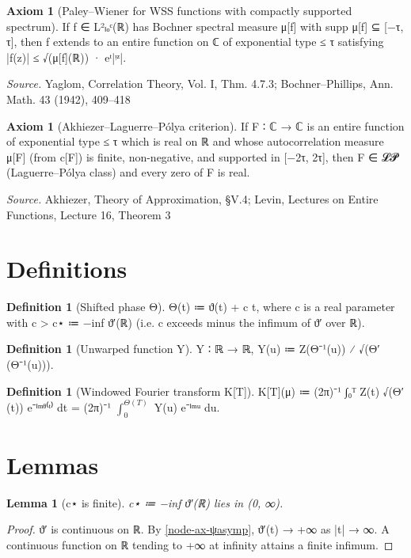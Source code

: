 \documentclass[11pt]{article}
\newtheorem{lemma}[theorem]{Lemma}
\theoremstyle{definition}
\newtheorem{definition}[theorem]{Definition}
\newtheorem{axiom}[theorem]{Axiom}
\begin{document}
\begin{axiom}[{Paley–Wiener for WSS functions with compactly supported spectrum}]\label{node-ax-PW}
If f ∈ L²ₗₒᶜ(ℝ) has Bochner spectral measure μ[f] with supp μ[f] ⊆ [−τ, τ], then f extends to an entire function on ℂ of exponential type ≤ τ satisfying |f(z)| ≤ √(μ[f](ℝ)) · eᵗ|ᵎᶻ|.
\end{axiom}
\noindent\textit{Source.} Yaglom, Correlation Theory, Vol. I, Thm. 4.7.3; Bochner–Phillips, Ann. Math. 43 (1942), 409–418

\begin{axiom}[{Akhiezer–Laguerre–Pólya criterion}]\label{node-ax-Akhiezer}
If F ∶ ℂ → ℂ is an entire function of exponential type ≤ τ which is real on ℝ and whose autocorrelation measure μ[F] (from c[F]) is finite, non-negative, and supported in [−2τ, 2τ], then F ∈ 𝓛𝓟 (Laguerre–Pólya class) and every zero of F is real.
\end{axiom}
\noindent\textit{Source.} Akhiezer, Theory of Approximation, §V.4; Levin, Lectures on Entire Functions, Lecture 16, Theorem 3

\section*{Definitions}
\begin{definition}[{Shifted phase Θ}]\label{node-def-Θ}
Θ(t) ≔ ϑ(t) + c t, where c is a real parameter with c > c⋆ ≔ −inf ϑ′(ℝ) (i.e. c exceeds minus the infimum of ϑ′ over ℝ).
\end{definition}

\begin{definition}[{Unwarped function Y}]\label{node-def-Y}
Y ∶ ℝ → ℝ,  Y(u) ≔ Z(Θ⁻¹(u)) ⁄ √(Θ′(Θ⁻¹(u))).
\end{definition}

\begin{definition}[{Windowed Fourier transform K[T]}]\label{node-def-KT}
K[T](μ) ≔ (2π)⁻¹ ∫₀ᵀ Z(t) √(Θ′(t)) e⁻ⁱᵐᶿ⁽ᵗ⁾ dt = (2π)⁻¹ \(\int_{0}^{Θ(T)}\) Y(u) e⁻ⁱᵐᵘ du.
\end{definition}

\section*{Lemmas}
\begin{lemma}[{c⋆ is finite}]\label{node-lem-c*}
c⋆ ≔ −inf ϑ′(ℝ) lies in (0, ∞).
\end{lemma}
\begin{proof}
ϑ′ is continuous on ℝ. By \ref{node-ax-ψasymp}, ϑ′(t) → +∞ as |t| → ∞. A continuous function on ℝ tending to +∞ at infinity attains a finite infimum.
\end{proof}
\end{document}
